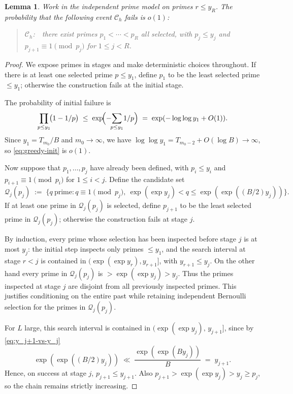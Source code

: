 \documentclass[11pt,reqno]{amsart}
\theoremstyle{plain}
\newtheorem{lemma}[theorem]{Lemma}
\theoremstyle{definition}
\begin{document}
\begin{lemma}\label{lem:greedy-h}
Work in the independent prime model on primes $r\le y_R$. The probability that
the following event $\mathcal{C}_h$ \emph{fails} is $o(1)$:
\begin{quote}
$\mathcal{C}_h$:\ \ there exist primes $p_1<\cdots<p_R$ all selected, with
$p_j\le y_j$ and $p_{j+1}\equiv 1\pmod{p_j}$ for $1\le j<R$.
\end{quote}
\end{lemma}

\begin{proof}
We expose primes in stages and make deterministic choices throughout. If there
is at least one selected prime $p\le y_1$, define $p_1$ to be the least
selected prime $\le y_1$; otherwise the construction fails at the initial
stage.

The probability of initial failure is
\begin{equation}\label{eq:greedy-init}
\prod_{p\le y_1}\!\bigl(1-1/p\bigr)
\;\le\;
\exp\!\Bigl(-\!\!\sum_{p\le y_1}\!1/p\Bigr)
\;=\;
\exp(-\log\log y_1+O(1)).
\end{equation}
Since $y_1=T_{m_0}/B$ and $m_0\to\infty$, we have
$\log\log y_1=T_{m_0-2}+O(\log B)\to\infty$, so \eqref{eq:greedy-init} is
$o(1)$.

Now suppose that $p_1,\dots,p_j$ have already been defined, with
$p_i\le y_i$ and $p_{i+1}\equiv 1\pmod{p_i}$ for $1\le i<j$. Define the
candidate set
\[
\mathcal Q_j(p_j)
\;:=\;
\bigl\{
q\ \text{prime}:
q\equiv 1\!\pmod{p_j},\
\exp(\exp y_j)<q\le \exp(\exp((B/2)y_j))
\bigr\}.
\]
If at least one prime in $\mathcal Q_j(p_j)$ is selected, define $p_{j+1}$ to
be the least selected prime in $\mathcal Q_j(p_j)$; otherwise the construction
fails at stage $j$.

By induction, every prime whose selection has been inspected before stage $j$
is at most $y_j$: the initial step inspects only primes $\le y_1$, and the
search interval at stage $r<j$ is contained in $(\exp(\exp y_r),y_{r+1}]$,
with $y_{r+1}\le y_j$. On the other hand every prime in
$\mathcal Q_j(p_j)$ is $>\exp(\exp y_j)>y_j$. Thus the primes inspected at
stage $j$ are disjoint from all previously inspected primes. This justifies
conditioning on the entire past while retaining independent Bernoulli
selection for the primes in $\mathcal Q_j(p_j)$.

For $L$ large, this search interval is contained in
$(\exp(\exp y_j),\,y_{j+1}]$, since by \eqref{eq:y_j+1-vs-y_j}
\[
\exp(\exp((B/2)y_j))
\;\ll\;
\frac{\exp(\exp(B y_j))}{B}
\;=\;
y_{j+1}.
\]
Hence, on success at stage $j$, $p_{j+1}\le y_{j+1}$. Also
$p_{j+1}>\exp(\exp y_j)>y_j\ge p_j$, so the chain remains strictly increasing.


\end{proof}
\end{document}
